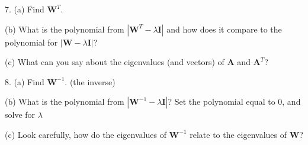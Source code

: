 \documentclass{article}
\begin{document}
\begin{flushleft}
\vspace{1in}

7. (a) Find $\textbf{W}^{T}$.

\vspace{1in}

\hspace{0.12in} (b) What is the polynomial from $|\textbf{W}^{T}- \lambda \textbf{I}  | $ and how does it compare to the polynomial for $|\textbf{W}- \lambda \textbf{I}  | $?

\vspace{1in}

\hspace{0.12in} (c) What can you say about the eigenvalues (and vectors) of $\textbf{A}$ and $\textbf{A}^{T}$?

\vspace{0.75in}

8. (a) Find $\textbf{W}^{-1}$. (the inverse)

\vspace{1in}

\hspace{0.12in} (b) What is the polynomial from $|\textbf{W}^{-1}- \lambda \textbf{I}  | $? Set the polynomial equal to 0, and solve for $\lambda$

\vspace{1in}

\hspace{0.12in} (c) Look carefully, how do the eigenvalues of $\textbf{W}^{-1}$ relate to the eigenvalues of \textbf{W}?



\end{flushleft}
\end{document}
